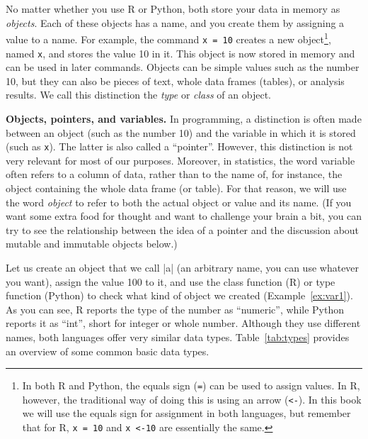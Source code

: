 No matter whether you use R or Python, both store your data in memory as \emph{objects}.
Each of these objects has a name, and you create them by
assigning a value to a name. For example, the command \texttt{x = 10}
creates a new object\footnote{In both R and Python, the equals
  sign (\texttt{=}) can be used to assign values. In R, however, the
  traditional way of doing this is using an arrow (\texttt{\textless-}). In
  this book we will use the equals sign for assignment in both
  languages, but remember that for R, \texttt{x = 10} and
  \texttt{x \textless-10} are essentially the same.}, named \texttt{x}, and stores the value 10
in it.  This object is now stored in memory and can be used in later
commands. Objects can be simple values such as the number 10, but they can also
be pieces of text, whole data frames (tables), or analysis results.
We call this distinction the \emph{type} or \emph{class} of an
object. 

\begin{feature}
\textbf{Objects, pointers, and variables.} In programming, a distinction is
  often made between an object (such as the number 10) and the
  variable in which it is stored (such as \texttt{x}). The latter is also called a ``pointer''.
  However, this distinction is not very relevant for most of our
  purposes. Moreover, in statistics, the word variable often refers to a
  column of data, rather than to the name of, for instance, the object
  containing the whole data frame (or table).  For that
  reason, we will use the word \emph{object} to refer to both the
  actual object or value and its name. (If you want some extra food
  for thought and want to challenge your brain
  a bit, you can try to see the relationship between the idea of a pointer and
  the discussion about mutable and immutable objects below.)
\end{feature}

Let us create an object that we call |a| (an arbitrary name, you can use
whatever you want), assign the value 100 to it, and use the class
function (R) or type function (Python) to check what kind of
object we created (Example~\ref{ex:var1}).
As you can see, R reports the type of the number as ``numeric'', while Python reports it
as ``int'', short for integer or whole number.  Although they use
different names, both languages offer very similar data types.
Table~\ref{tab:types} provides an overview of some common basic data types.


